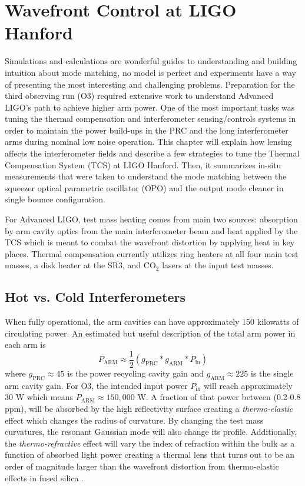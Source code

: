 \chapter{Wavefront Control at LIGO Hanford}\label{chapter:MM_LHO}
	Simulations and calculations are wonderful guides to understanding and building intuition about mode matching,  no model is perfect and experiments have a way of presenting the most interesting and challenging problems.  Preparation for the third observing run (O3) required extensive work to understand Advanced LIGO's path to achieve higher arm power.  One of the most important tasks was tuning the thermal compensation and interferometer sensing/controls systems in order to maintain the power build-ups in the PRC and the long interferometer arms during nominal low noise operation.  This chapter will explain how lensing affects the interferometer fields and describe a few strategies to tune the Thermal Compensation System (TCS) at LIGO Hanford. Then, it summarizes in-situ measurements that were taken to understand the mode matching between the squeezer optical parametric oscillator (OPO) and the output mode cleaner in single bounce configuration.
	
	For Advanced LIGO, test mass heating comes from main two sources: absorption by arm cavity optics from the main interferometer beam and heat applied by the TCS which is meant to combat the wavefront distortion by applying heat in key places.  Thermal compensation currently utilizes ring heaters at all four main test masses, a disk heater at the SR3, and CO$_2$ lasers at the input test masses.
	
	\section{Hot vs. Cold Interferometers}\label{sec:hotcoldifo}
	When fully operational, the arm cavities can have approximately 150 kilowatts of circulating power. An estimated but useful description of the total arm power in each arm is
	\begin{equation}
		P_{\text{ARM}} \approx \frac{1}{2} (g_{\text{PRC}} * g_{\text{ARM}} * P_{\text{in}})
	\end{equation}
	where $g_{\text{PRC}} \approx 45$ is the power recycling cavity gain and $g_{\text{ARM}} \approx 225$ is the single arm cavity gain. For O3, the intended input power $P_{\text{in}}$ will reach approximately 30 W which means $P_{\text{ARM}} \approx 150,000$ W. A fraction of that power between (0.2-0.8 ppm), will be absorbed by the high reflectivity surface creating a \textit{thermo-elastic} effect which changes the radius of curvature. By changing the test mass curvatures, the resonant Gaussian mode will also change its profile. Additionally, the \textit{thermo-refractive} effect will vary the index of refraction within the bulk as a function of absorbed light power creating a thermal lens that turns out to be an order of magnitude larger than the wavefront distortion from thermo-elastic effects in fused silica \cite{winkler_thermaldist}.
	
